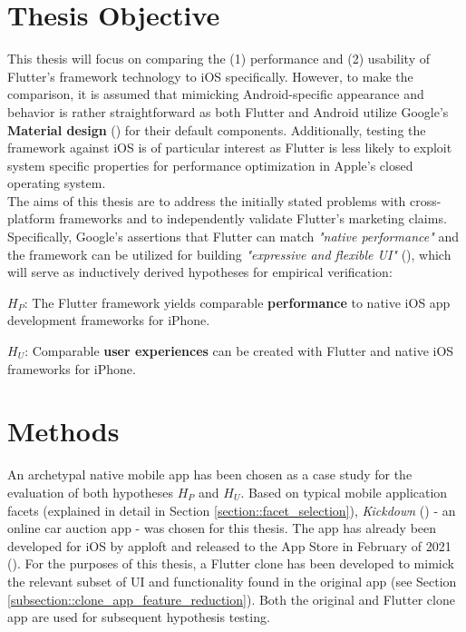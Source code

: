 \section{Thesis Objective} \label{section::thesis_objective}
This thesis will focus on comparing the (1) performance and (2) usability of Flutter's framework technology to iOS specifically. However, to make the comparison, it is assumed that mimicking Android-specific appearance and behavior is rather straightforward as 
both Flutter and Android utilize Google's \textbf{Material design} (\cite{Google2021}) for their default components.
Additionally, testing the framework against iOS is of particular interest as Flutter is less likely
to exploit system specific properties for performance optimization in Apple's closed operating system.\\
The aims of this thesis are to address the initially stated problems with cross-platform frameworks and to independently validate Flutter's marketing claims.
Specifically, Google's assertions that Flutter can match \textit{"native performance"} and the framework can be utilized for building \textit{"expressive and flexible UI"} (\cite{FlutterDev20}),
which will serve as inductively derived hypotheses for empirical verification:

\textbf{$H_P$}: The Flutter framework yields comparable \textbf{performance} to native iOS  app development frameworks for iPhone.

\textbf{$H_U$}: Comparable \textbf{user experiences} can be created with Flutter and native iOS frameworks for iPhone.

\section{Methods} \label{section::methods}
An archetypal native mobile app has been chosen as a case study for the evaluation of both hypotheses $H_P$ and $H_U$.
Based on typical mobile application facets (explained in detail in Section \ref{section::facet_selection}), \textit{Kickdown} (\cite{Kickdown2021}) - an online car auction app - was chosen for this thesis. 
The app has already been developed for iOS by apploft and released to the App Store in February of 2021 (\cite{Apple2021e}).
For the purposes of this thesis, a Flutter clone has been developed to mimick the relevant subset of UI and functionality found in the original app (see Section \ref{subsection::clone_app_feature_reduction}). 
Both the original and Flutter clone app are used for subsequent hypothesis testing.


